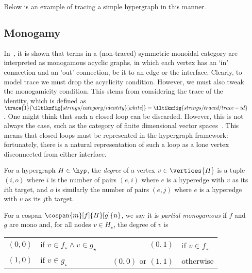\begin{example}
    Below is an example of tracing a simple hypergraph in this manner.
    \begin{center}
    \end{center}
\end{example}

\subsection{Monogamy}

In~\cite{bonchi2016rewriting}, it is shown that terms in a (non-traced)
symmetric monoidal category are interpreted as monogamous acyclic graphs, in
which each vertex has an `in' connection and an 'out' connection, be it to an
edge or the interface.
Clearly, to model trace we must drop the acyclicity condition.
However, we must also tweak the monogamicity condition.
This stems from considering the trace of the identity, which is defined as
\(
    \trace{1}{\iltikzfig{strings/category/identity}[white]}
    =
    \iltikzfig{strings/traced/trace-id}
\).
One might think that such a closed loop can be discarded.
However, this is not always the case, such as the category of finite dimensional
vector spaces~\cite[Sec. 6.1]{hasegawa1997recursion}.
This means that closed loops must be represented in the hypergraph framework:
fortunately, there is a natural representation of such a loop as a lone vertex
disconnected from either interface.

\begin{definition}
    For a hypergraph \(H \in \hyp\), the \emph{degree} of a vertex
    \(v \in \vertices{H}\) is a tuple \((i,o)\) where \(i\) is the number of
    pairs \((e,i)\) where \(e\) is a hyperedge with \(v\) as its \(i\)th target,
    and \(o\) is similarly the number of pairs \((e,j)\) where \(e\) is a
    hyperedge with \(v\) as its \(j\)th target.
\end{definition}

\begin{definition}
    For a cospan \(\cospan{m}[f]{H}[g]{n}\), we say it is
    \emph{partial monogamous} if \(f\) and \(g\) are mono and, for all nodes
    \(v \in H_\star\), the degree of \(v\) is

    \begin{center}
        \begin{tabular}{rlcrl}
            \((0,0)\)
            &
            if \(v \in f_\star \wedge v \in g_\star\)
            &
            \quad
            &
            \((0,1)\)
            &
            if \(v \in f_\star\)
            \\
            \((1,0)\)
            &
            if \(v \in g_\star\)
            &
            \quad
            &
            \((0,0)\)
            or \((1,1)\)
            &
            otherwise
        \end{tabular}
    \end{center}
\end{definition}

